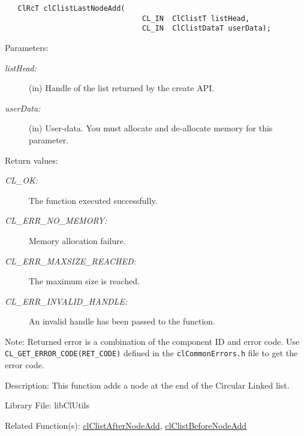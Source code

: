 \begin{flushleft}
\begin{Desc}
\footnotesize\begin{verbatim}   ClRcT clClistLastNodeAdd(
                          		CL_IN  ClClistT listHead,
                          		CL_IN  ClClistDataT userData);
\end{verbatim}
\normalsize
\end{Desc}
\begin{Desc}
\item[Parameters:]
\begin{description}
\item[{\em list\-Head:}](in) Handle of the list returned by the create API. \item[{\em user\-Data:}](in) User-data. 
You must allocate and de-allocate memory for this parameter.\end{description}
\end{Desc}
\begin{Desc}
\item[Return values:]
\begin{description}
\item[{\em CL\_\-OK:}]The function executed successfully. \item[{\em CL\_\-ERR\_\-NO\_\-MEMORY:}]Memory allocation failure. 
\item[{\em CL\_\-ERR\_\-MAXSIZE\_\-REACHED:}]The maximum size is reached. 
\item[{\em CL\_\-ERR\_\-INVALID\_\-HANDLE:}]An invalid handle has been passed to the function.\end{description}
\end{Desc}
\begin{Desc}
\item[Note:]Returned error is a combination of the component ID and error code. Use {\tt{CL\_\-GET\_\-ERROR\_\-CODE(RET\_\-CODE)}} defined in 
the {\tt{clCommonErrors.h}} file to get the error code.\end{Desc}
\begin{Desc}
\item[Description:]This function adds a node at the end of the Circular Linked list.\end{Desc}
\begin{Desc}
\item[Library File:]lib\-Cl\-Utils\end{Desc}
\begin{Desc}
\item[Related Function(s):]\hyperlink{pagecl104}{cl\-Clist\-After\-Node\-Add}, \hyperlink{pagecl105}{cl\-Clist\-Before\-Node\-Add} \end{Desc}
\newpage



\end{flushleft}
